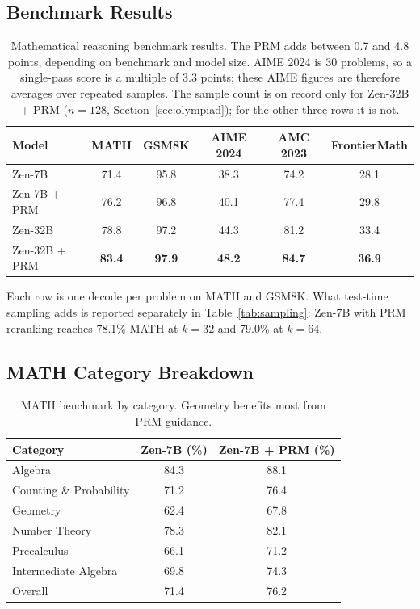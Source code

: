 \documentclass[11pt,a4paper]{article}
\begin{document}
\subsection{Benchmark Results}

\begin{table}[H]
\centering
\begin{tabular}{lccccc}
\toprule
\textbf{Model} & \textbf{MATH} & \textbf{GSM8K} & \textbf{AIME 2024} & \textbf{AMC 2023} & \textbf{FrontierMath} \\
\midrule
Zen-7B & 71.4 & 95.8 & 38.3 & 74.2 & 28.1 \\
Zen-7B + PRM & 76.2 & 96.8 & 40.1 & 77.4 & 29.8 \\
Zen-32B & 78.8 & 97.2 & 44.3 & 81.2 & 33.4 \\
Zen-32B + PRM & \textbf{83.4} & \textbf{97.9} & \textbf{48.2} & \textbf{84.7} & \textbf{36.9} \\
\bottomrule
\end{tabular}
\caption{Mathematical reasoning benchmark results. The PRM adds between 0.7 and 4.8
points, depending on benchmark and model size. AIME 2024 is 30 problems, so a
single-pass score is a multiple of 3.3 points; these AIME figures are therefore
averages over repeated samples. The sample count is on record only for
Zen-32B + PRM ($n=128$, Section~\ref{sec:olympiad}); for the other three rows it
is not.}
\end{table}

Each row is one decode per problem on MATH and GSM8K. What test-time sampling adds
is reported separately in Table~\ref{tab:sampling}: Zen-7B with PRM reranking reaches
78.1\% MATH at $k=32$ and 79.0\% at $k=64$.

\subsection{MATH Category Breakdown}

\begin{table}[H]
\centering
\begin{tabular}{lcc}
\toprule
\textbf{Category} & \textbf{Zen-7B (\%)} & \textbf{Zen-7B + PRM (\%)} \\
\midrule
Algebra & 84.3 & 88.1 \\
Counting \& Probability & 71.2 & 76.4 \\
Geometry & 62.4 & 67.8 \\
Number Theory & 78.3 & 82.1 \\
Precalculus & 66.1 & 71.2 \\
Intermediate Algebra & 69.8 & 74.3 \\
\midrule
Overall & 71.4 & 76.2 \\
\bottomrule
\end{tabular}
\caption{MATH benchmark by category. Geometry benefits most from PRM guidance.}
\end{table}
\end{document}
